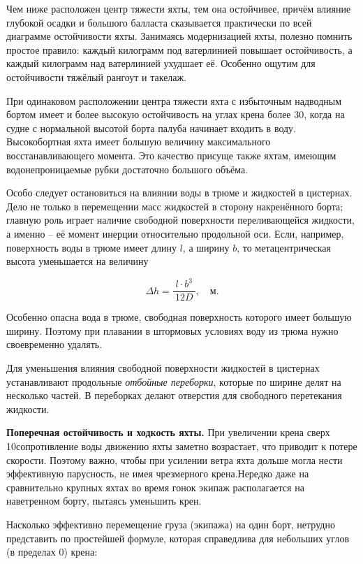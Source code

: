 Чем ниже расположен центр тяжести яхты, тем она остойчивее, причём
влияние глубокой осадки и большого балласта сказывается практически по
всей диаграмме остойчивости яхты. Занимаясь модернизацией яхты,
полезно помнить простое правило: каждый килограмм под ватерлинией
повышает остойчивость, а каждый килограмм над ватерлинией ухудшает
её. Особенно ощутим для остойчивости тяжёлый рангоут и такелаж.

При одинаковом расположении центра тяжести яхта с избыточным надводным
бортом имеет и более высокую остойчивость на углах крена более 30\gr, когда на судне с нормальной высотой борта палуба начинает
входить в воду. Высокобортная яхта имеет большую величину
максимального восстанавливающего момента. Это качество присуще также
яхтам, имеющим водонепроницаемые рубки достаточно большого объёма.

Особо следует остановиться на влиянии воды в трюме и жидкостей в
цистернах. Дело не только в перемещении масс жидкостей в сторону
накренённого борта; главную роль играет наличие свободной поверхности
переливающейся жидкости, а именно \--- её момент инерции относительно
продольной оси. Если, например, поверхность воды в трюме имеет длину
$l$, а ширину $b$, то метацентрическая высота уменьшается на величину

\begin{equation}
  \Delta h = \frac{l \cdot b^3}{\ 12D\ }, \quad \text{м.}
\end{equation}

Особенно опасна вода в трюме, свободная поверхность которого имеет
большую ширину. Поэтому при плавании в штормовых условиях воду из
трюма нужно своевременно удалять.

Для уменьшения влияния свободной поверхности жидкостей в цистернах
устанавливают продольные \textit{отбойные переборки},
которые по ширине делят на несколько частей. В переборках делают
отверстия для свободного перетекания жидкости.

\textbf{Поперечная остойчивость и ходкость яхты.}
 При увеличении крена
сверх 10\gr сопротивление воды движению яхты заметно
возрастает, что приводит к потере скорости. Поэтому важно, чтобы при
усилении ветра яхта дольше могла нести эффективную парусность, не имея
чрезмерного крена.Нередко даже на сравнительно крупных яхтах во время
гонок экипаж располагается на наветренном борту, пытаясь уменьшить
крен.

Насколько эффективно перемещение груза (экипажа) на один борт,
нетрудно представить по простейшей формуле, которая справедлива для
небольших углов (в пределах 0\gr) крена:

